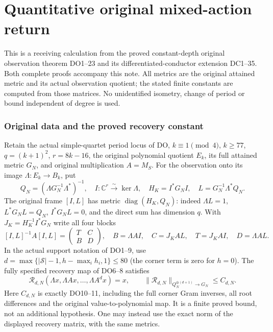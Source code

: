 \documentclass[11pt]{article}
\begin{document}
\endgroup

\clearpage\begingroup
\part*{Quantitative original mixed-action return}
\newcommand{\pmixedrank}{\operatorname{rank}}
\newcommand{\pmixeddiag}{\operatorname{diag}}


This is a receiving calculation from the proved constant-depth original
observation theorem DO1--23 and its differentiated-conductor extension
DC1--35. Both complete proofs accompany this note. All metrics are the
original attained metric and its actual observation quotient; the stated
finite constants are computed from those matrices. No unidentified
isometry, change of period or bound independent of degree is used.

\section{Original data and the proved recovery constant}
Retain the actual simple-quartet period locus of DO, $k\equiv1\pmod4$,
$k\ge77$, $q=(k+1)^2$, $r=8k-16$, the original polynomial quotient
$E_k$, its full attained metric $G_N$, and original multiplication $A=M_S$.
For the observation onto its image $\Lambda:E_k\to B_k$, put
\[
 Q_N=(\Lambda G_N^{-1}\Lambda^*)^{-1},\quad
 I:\mathbb C^r\overset\sim\longrightarrow\ker\Lambda,
 \quad H_K=I^*G_NI,\quad L=G_N^{-1}\Lambda^*Q_N.
 \tag{DQ1}
\]
The original frame $[I,L]$ has metric $\pmixeddiag(H_K,Q_N)$: indeed
$\Lambda L=1$, $L^*G_NL=Q_N$, $I^*G_NL=0$, and the direct sum
has dimension $q$. With $J_K=H_K^{-1}I^*G_N$ write all four blocks
\[
 [I,L]^{-1}A[I,L]=\begin{pmatrix}T&C\\B&D\end{pmatrix},\quad
 B=\Lambda AI,\quad C=J_KAL,\quad T=J_KAI,\quad D=\Lambda AL.
 \tag{DQ2}
\]
In the actual support notation of DO1--9, use
$d=\max\{|\mathcal S|-1,h-\max_i h_i,1\}\le80$ (the corner term
is zero for $h=0$). The fully specified recovery map of DO6--8 satisfies
\[
 \mathcal R_{d,N}(\Lambda x,\Lambda Ax,\ldots,\Lambda A^dx)=x,
 \qquad \|\mathcal R_{d,N}\|_{Q_N^{\oplus(d+1)}\to G_N}
       \le C_{d,N}.\tag{DQ3}
\]
Here $C_{d,N}$ is exactly DO10--11, including the full corner Gram
inverses, all root differences and the original value-to-polynomial map.
It is a finite proved bound, not an additional hypothesis. One may instead
use the exact norm of the displayed recovery matrix, with the same metrics.
\end{document}
